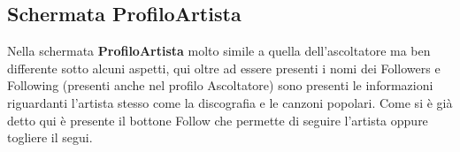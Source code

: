 \documentclass[11pt]{article}
\begin{document}
	\subsection{Schermata ProfiloArtista}

	Nella schermata \textbf{ProfiloArtista} molto simile a quella dell'ascoltatore ma ben differente sotto alcuni aspetti, qui oltre ad essere presenti i nomi dei Followers e Following (presenti anche nel profilo Ascoltatore) 
	sono presenti le informazioni riguardanti l'artista stesso come la discografia e le canzoni popolari.
	Come si è già detto qui è presente il bottone Follow che permette di seguire l'artista oppure togliere il segui. 
	\begin{figure}[h]
		\centering
	\end{figure}

	
\end{document}
